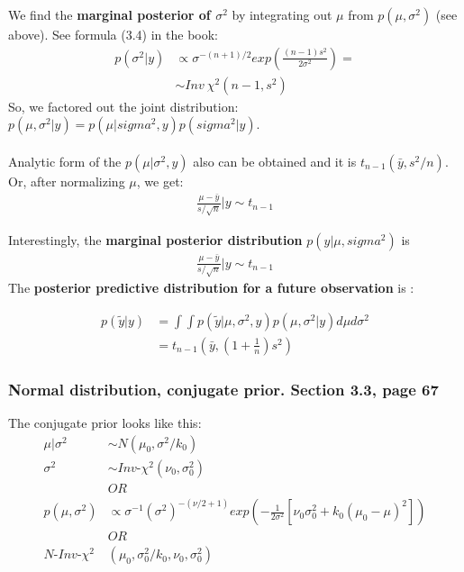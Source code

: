 \documentclass[]{article}
\begin{document}
We find the \textbf{marginal posterior of $\sigma^2$} by integrating out $\mu$ from $p(\mu, \sigma^2)$ (see above). See formula (3.4) in the book:
$$
\begin{aligned}
	p(\sigma^2|y) &\propto  \sigma^{-(n+1)/2} exp\left(\frac{ (n-1)s^2}{  2\sigma^2 }  \right) =\\
	   & \sim Inv~\chi^2(n-1, s^2)
\end{aligned}
$$
So, we factored out the joint distribution: $p(\mu, \sigma^2|y) = p(\mu|sigma^2, y)p(sigma^2| y)$.\\
\\
Analytic form of the $p(\mu|\sigma^2,y)$ also can be obtained and it is $t_{n-1}(\bar{y}, s^2/n)$. Or, after normalizing $\mu$, we get:
$$
\begin{aligned}
	\frac{\mu - \bar{y}}{s/\sqrt{n}}|y\sim  t_{n-1}
\end{aligned}
$$

Interestingly, the \textbf{marginal posterior distribution} $p(y|\mu,sigma^2)$ is
$$
\begin{aligned}
	\frac{\mu - \bar{y}}{s/\sqrt{n}}|y\sim  t_{n-1}
\end{aligned}
$$
The \textbf{posterior predictive distribution for a future observation} is :

$$
\begin{aligned}
	p(\tilde{y}|y) &= \int \int p(\tilde{y}|\mu, \sigma^2, y)p(\mu, \sigma^2 | y)d\mu d\sigma^2\\
	 &=t_{n-1}\left(\bar{y}, \left(1+\frac{1}{n}\right)s^2\right)
\end{aligned}
$$



\subsubsection{Normal distribution, conjugate prior. Section 3.3, page 67}
The conjugate prior looks like this:
$$
\begin{aligned}
	\mu|\sigma^2 &\sim N(\mu_0, \sigma^2/k_0)\\
	     \sigma^2 &\sim Inv\mbox{-}\chi^2(\nu_0, \sigma_0^2)\\
			&OR\\
			p(\mu, \sigma^2) &\propto \sigma^{-1}(\sigma^2)^{-(\nu/2 + 1)}exp\left( -\frac{1}{2\sigma^2}\left[\nu_0\sigma_0^2 + k_0(\mu_0 - \mu)^2 \right]  \right)\\
			&OR\\
	N \mbox{-} Inv \mbox{-} \chi^2&(\mu_0, \sigma_0^2/k_0, \nu_0, \sigma_0^2)
\end{aligned}
$$
\end{document}
